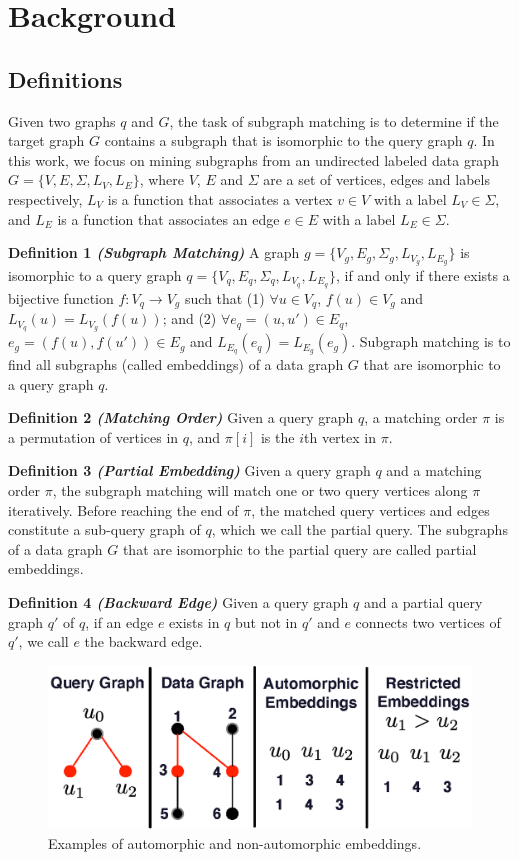 \section{Background}
\subsection{Definitions}
Given two graphs $q$ and $G$, the task of subgraph matching is to determine if the target graph $G$ contains a subgraph that is isomorphic
to the query graph $q$. In this work, we focus on mining subgraphs from an undirected labeled data graph $G=\{V,E,\Sigma,L_V,L_E\}$, where
$V$, $E$ and $\Sigma$ are a set of vertices, edges and labels respectively,  $L_V$ is a function that associates a vertex $v \in V$ with a
label $L_V \in \Sigma$, and $L_E$ is a function that associates an edge $e \in E$ with a label $L_E \in \Sigma$.


\noindent
\textbf{Definition 1 \emph{(Subgraph Matching)}} A graph $g=\{V_g,E_g,\Sigma_g,L_{V_g},L_{E_g}\}$ is isomorphic to a query graph $q=\{V_q,E_q,\Sigma_q,L_{V_q},L_{E_q}\}$, if and only if there exists a bijective function $f: V_q \rightarrow V_g$ such that (1) $\forall u \in V_q$, $f(u) \in V_g$ and $L_{V_q}(u) = L_{V_g}(f(u))$; and (2) $\forall e_q=(u,u') \in E_q$, $e_g=(f(u),f(u')) \in E_g$ and $L_{E_q}(e_q)=L_{E_g}(e_g)$. Subgraph matching is to find all subgraphs (called embeddings) of a data graph $G$ that are isomorphic to a query graph $q$.

\noindent
\textbf{Definition 2 \emph{(Matching Order)}} Given a query graph $q$, a matching order $\pi$ is a permutation of vertices in $q$, and $\pi[i]$ is the $i$th vertex in $\pi$.

\noindent
\textbf{Definition 3 \emph{(Partial Embedding)}} Given a query graph $q$ and a matching order $\pi$, the subgraph matching will match one or two query vertices along $\pi$ iteratively. Before reaching the end of $\pi$, the matched query vertices and edges constitute a sub-query graph of $q$, which we call the partial query. The subgraphs of a data graph $G$ that are isomorphic to the partial query are called partial embeddings.

\noindent
\textbf{Definition 4 \emph{(Backward Edge)}} Given a query graph $q$ and a partial query graph $q'$ of $q$, if an edge $e$ exists in $q$ but not in $q'$ and $e$ connects two vertices of $q'$, we call $e$ the backward edge.

\begin{figure}
\centering
\includegraphics[width=\columnwidth]{./figure/automorphism.eps}
\caption{Examples of automorphic and non-automorphic embeddings.}	
\label{fig:automo}
\end{figure}

